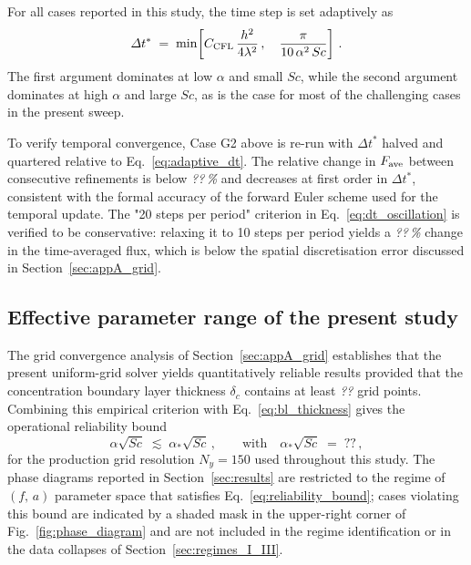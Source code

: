 \documentclass[lineno]{JFM-FLM_Au}
\begin{document}
For all cases reported in this study, the time step is set adaptively
as
\begin{equation}
\Delta t^{*} \;=\; \min\!\left[
C_{\rm CFL}\,\frac{h^{2}}{4\lambda^{2}}\,,\quad
\frac{\pi}{10\,\alpha^{2}\,Sc}
\right]\,.
\label{eq:adaptive_dt}
\end{equation}
The first argument dominates at low $\alpha$ and small $Sc$, while the
second argument dominates at high $\alpha$ and large $Sc$, as is the
case for most of the challenging cases in the present sweep.
 
To verify temporal convergence, Case G2 above is re-run with $\Delta t^*$
halved and quartered relative to Eq.~\eqref{eq:adaptive_dt}. The
relative change in $F_{\rm ave}$ between consecutive refinements is
below \textit{??\,\%} and decreases at first order in $\Delta t^*$,
consistent with the formal accuracy of the forward Euler scheme used
for the temporal update. The "20 steps per period" criterion in
Eq.~\eqref{eq:dt_oscillation} is verified to be conservative: relaxing
it to 10 steps per period yields a \textit{??\,\%} change in the
time-averaged flux, which is below the spatial discretisation error
discussed in Section~\ref{sec:appA_grid}.
 
\subsection{Effective parameter range of the present study}
\label{sec:appA_range}
 
The grid convergence analysis of Section~\ref{sec:appA_grid} establishes
that the present uniform-grid solver yields quantitatively reliable
results provided that the concentration boundary layer thickness
$\delta_{c}$ contains at least \textit{??} grid points. Combining this
empirical criterion with Eq.~\eqref{eq:bl_thickness} gives the
operational reliability bound
\begin{equation}
\alpha \sqrt{Sc} \;\lesssim\; \alpha_{*}\sqrt{Sc}\,, \qquad
\text{with}\quad \alpha_{*}\sqrt{Sc} \;=\; \textit{??}\,,
\label{eq:reliability_bound}
\end{equation}
for the production grid resolution $N_{y} = 150$ used throughout this
study. The phase diagrams reported in Section~\ref{sec:results} are
restricted to the regime of $(f,\,a)$ parameter space that satisfies
Eq.~\eqref{eq:reliability_bound}; cases violating this bound are
indicated by a shaded mask in the upper-right corner of
Fig.~\ref{fig:phase_diagram} and are not included in the regime
identification or in the data collapses of
Section~\ref{sec:regimes_I_III}.
 
\end{document}
